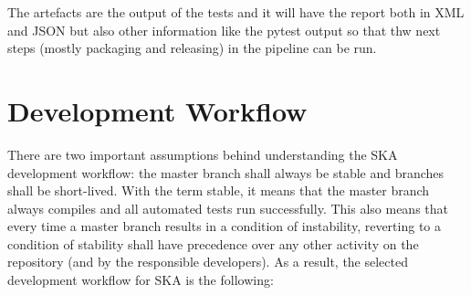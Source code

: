\documentclass[a4paper]{spie}  %
\begin{document}
The artefacts are the output of the tests and it will have the report both in XML and JSON but also other information like the pytest output so that thw next steps (mostly packaging and releasing) in the pipeline can be run.

\section{Development Workflow}
There are two important assumptions behind understanding the SKA development workflow: the master branch shall always be stable and branches shall be short-lived. With the term stable, it means that the master branch always compiles and all automated tests run successfully. This also means that every time a master branch results in a condition of instability, reverting to a condition of stability shall have precedence over any other activity on the repository (and by the responsible developers).
As a result, the selected development workflow for SKA is the following:
\end{document}
